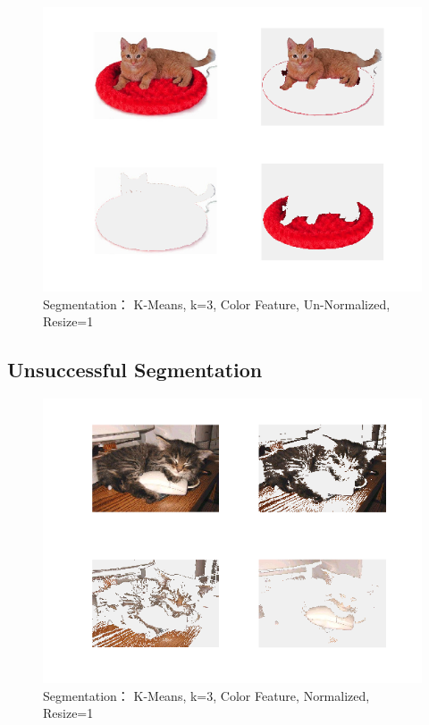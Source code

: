 \documentclass[12pt]{article}
\begin{document}
\begin{figure}[h!]
	\centering
    \includegraphics[scale=0.45]{seg_3_kmeans_color_false_1}
    \caption{Segmentation： K-Means, k=3, Color Feature, Un-Normalized, Resize=1}
\end{figure}

\subsection{Unsuccessful Segmentation}
\begin{figure}[h!]
	\centering
    \includegraphics[scale=0.45]{seg_3_kmeans_color_true_1_us}
    \caption{Segmentation： K-Means, k=3, Color Feature, Normalized, Resize=1}
\end{figure}
\end{document}
